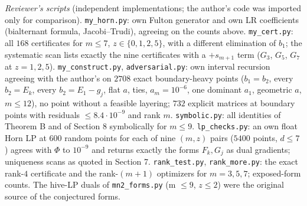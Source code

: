\documentclass[
  11pt,
  a4paper,
]{article}
\begin{document}
\emph{Reviewer's scripts} (independent implementations; the author's
code was imported only for comparison). {\small\texttt{my\_\allowbreak{}horn.\allowbreak{}py}}: own Fulton
generator and own LR coefficients (bialternant formula, Jacobi--Trudi),
agreeing on the counts above. {\small\texttt{my\_\allowbreak{}cert.\allowbreak{}py}}: all \(168\)
certificates for \(m\le7\), \(z\in\{0,\allowbreak{}1,\allowbreak{}2,\allowbreak{}5\}\), with a different
elimination of \(b_1\); the systematic scan lists exactly the nine
certificates with a \(+s_{m+1}\) term (\(G_3\), \(G_5\), \(G_7\) at
\(z=1,\allowbreak{}2,\allowbreak{}5\)). {\small\texttt{my\_\allowbreak{}construct.\allowbreak{}py}}, {\small\texttt{adversarial.\allowbreak{}py}}: own
interval recursion agreeing with the author's on \(2708\) exact
boundary-heavy points (\(b_1=b_2\), every \(b_2=E_k\), every
\(b_2=E_1-g_j\), flat \(a\), ties, \(a_m=10^{-6}\), one dominant
\(a_1\), geometric \(a\), \(m\le12\)), no point without a feasible
layering; \(732\) explicit matrices at boundary points with residuals
\(\le8.4\cdot10^{-9}\) and rank \(m\). {\small\texttt{symbolic.\allowbreak{}py}}: all
identities of Theorem B and of Section 8 symbolically for \(m\le9\).
{\small\texttt{lp\_\allowbreak{}checks.\allowbreak{}py}}: an own float Horn LP at \(600\) random points
for each of nine \((m,\allowbreak{}z)\) pairs (\(5400\) points, \(d\le7\)) agrees
with \(\Phi\) to \(10^{-9}\) and returns exactly the forms \(F_k,\allowbreak{}G_j\)
as dual gradients; uniqueness scans as quoted in Section 7.
{\small\texttt{rank\_\allowbreak{}test.\allowbreak{}py}}, {\small\texttt{rank\_\allowbreak{}more.\allowbreak{}py}}: the exact rank-\(4\)
certificate and the rank-\((m+1)\) optimizers for \(m=3,\allowbreak{}5,\allowbreak{}7\);
exposed-form counts. The hive-LP duals of {\small\texttt{mn2\_\allowbreak{}forms.\allowbreak{}py}} (m
\(\le9\), \(z\le2\)) were the original source of the conjectured forms.
\end{document}
